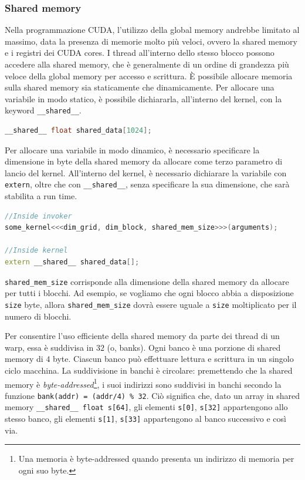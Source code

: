 \subsubsection{Shared memory}
Nella programmazione CUDA, l'utilizzo della global memory andrebbe limitato al massimo, data la presenza di memorie molto più veloci, ovvero la shared memory e i registri dei CUDA cores.
I thread all'interno dello stesso blocco possono accedere alla shared memory, che è generalmente di un ordine di grandezza più veloce della global memory per accesso e scrittura.
È possibile allocare memoria sulla shared memory sia staticamente che dinamicamente.
Per allocare una variabile in modo statico, è possibile dichiararla, all'interno del kernel, con la keyword \texttt{\_\_shared\_\_}.

\begin{lstlisting}[language=C++, numbers=none]
__shared__ float shared_data[1024];
\end{lstlisting}

Per allocare una variabile in modo dinamico, è necessario specificare la dimensione in byte della shared memory da allocare come terzo parametro di lancio del kernel.
All'interno del kernel, è necessario dichiarare la variabile con \texttt{extern}, oltre che con \texttt{\_\_shared\_\_}, senza specificare la sua dimensione, che sarà stabilita a run time.

\begin{lstlisting}[language=C++, numbers=none]
//Inside invoker
some_kernel<<<dim_grid, dim_block, shared_mem_size>>>(arguments);

//Inside kernel
extern __shared__ shared_data[];
\end{lstlisting}

\begin{note}{}
    \texttt{shared\_mem\_size} corrisponde alla dimensione della shared memory da allocare per tutti i blocchi.
    Ad esempio, se vogliamo che ogni blocco abbia a disposizione \texttt{size} byte, allora \texttt{shared\_mem\_size} dovrà essere uguale a \texttt{size} moltiplicato per il numero di blocchi.
\end{note}

Per consentire l'uso efficiente della shared memory da parte dei thread di un warp, essa è suddivisa in \(32\)  (o, banks).
Ogni banco è una porzione di shared memory di \(4\) byte.
Ciascun banco può effettuare lettura e scrittura in un singolo ciclo macchina.
La suddivisione in banchi è circolare: premettendo che la shared memory è \textit{byte-addressed}\footnote{Una memoria è byte-addressed quando presenta un indirizzo di memoria per ogni suo byte.}, i suoi indirizzi sono suddivisi in banchi secondo la funzione \texttt{bank(addr) = (addr/4) \% 32}.
Ciò significa che, dato un array in shared memory \texttt{\_\_shared\_\_ float s[64]}, gli elementi \texttt{s[0]}, \texttt{s[32]} appartengono allo stesso banco, gli elementi \texttt{s[1]}, \texttt{s[33]} appartengono al banco successivo e così via.

